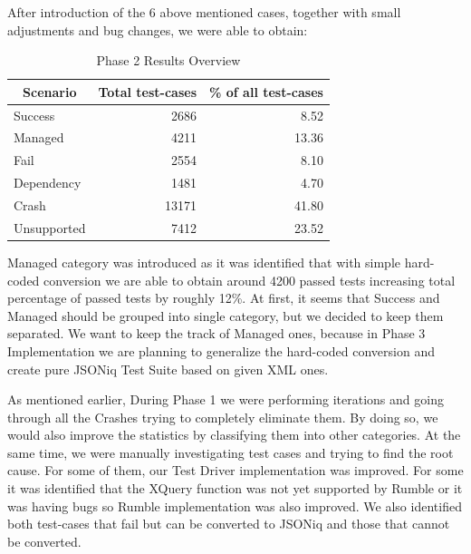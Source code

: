 After introduction of the 6 above mentioned cases, together with small adjustments and bug changes, we were able to obtain:
\begin{table}[h!]
	\centering
	\begin{tabular}{|l|r|r|}
		\hline
		\multicolumn{1}{|c|}{Scenario} & \multicolumn{1}{c|}{Total test-cases} & \multicolumn{1}{c|}{\% of all test-cases} \\ \hline
		Success                        & 2686                                  & 8.52                                      \\ \hline
		Managed                        & 4211                                  & 13.36                                     \\ \hline
		Fail                           & 2554                                  & 8.10                                      \\ \hline
		Dependency                     & 1481                                  & 4.70                                      \\ \hline
		Crash                          & 13171                                 & 41.80                                     \\ \hline
		Unsupported                    & 7412                                  & 23.52                                     \\ \hline
	\end{tabular}
	\caption{Phase 2 Results Overview}
	\label{tab:Phase2_ResultTable}
\end{table}

\vspace{-5mm}
Managed category was introduced as it was identified that with simple hard-coded conversion we are able to obtain around 4200 passed tests increasing total percentage of passed tests by roughly 12\%. At first, it seems that Success and Managed should be grouped into single category, but we decided to keep them separated. We want to keep the track of Managed ones, because in Phase 3 Implementation we are planning to generalize the hard-coded conversion and create pure JSONiq Test Suite based on given XML ones.

As mentioned earlier, During Phase 1 we were performing iterations and going through all the Crashes trying to completely eliminate them. By doing so, we would also improve the statistics by classifying them into other categories. At the same time, we were manually investigating test cases and trying to find the root cause. For some of them, our Test Driver implementation was improved. For some it was identified that the XQuery function was not yet supported by Rumble or it was having bugs so Rumble implementation was also improved. We also identified both test-cases that fail but can be converted to JSONiq and those that cannot be converted.

